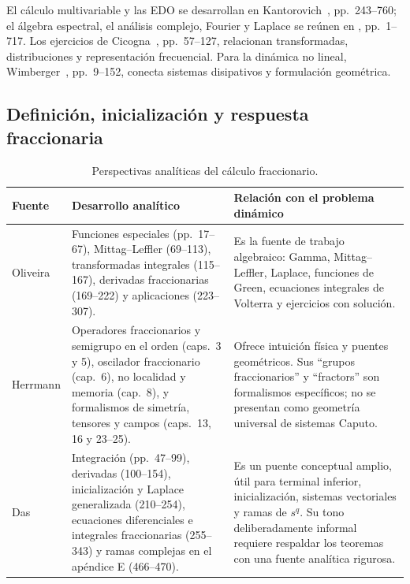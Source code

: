 El cálculo multivariable y las EDO se desarrollan en
Kantorovich~\cite{Kantorovich2022Fundamentals}, pp.\ 243--760; el álgebra
espectral, el análisis complejo, Fourier y Laplace se reúnen en
\cite{Kantorovich2024Advanced}, pp.\ 1--717. Los ejercicios de
Cicogna~\cite{Cicogna2020Exercises}, pp.\ 57--127, relacionan transformadas,
distribuciones y representación frecuencial. Para la dinámica no lineal,
Wimberger~\cite{Wimberger2022Nonlinear}, pp.\ 9--152, conecta sistemas
disipativos y formulación geométrica.

\subsection{Definición, inicialización y respuesta fraccionaria}

\begin{table}[H]
\centering
\caption{Perspectivas analíticas del cálculo fraccionario.}
\label{tab:ruta-frac-books}
\small
\begin{tabularx}{\textwidth}{@{}L{0.24\textwidth}L{0.29\textwidth}Y@{}}
\toprule
Fuente & Desarrollo analítico & Relación con el problema dinámico \\
\midrule
Oliveira \cite{Oliveira2019SolvedFractional} &
Funciones especiales (pp.\ 17--67), Mittag--Leffler (69--113), transformadas
integrales (115--167), derivadas fraccionarias (169--222) y aplicaciones
(223--307). &
Es la fuente de trabajo algebraico: Gamma, Mittag--Leffler, Laplace,
funciones de Green, ecuaciones integrales de Volterra y ejercicios con
solución. \\
Herrmann \cite{Herrmann2014Fractional} &
Operadores fraccionarios y semigrupo en el orden (caps.\ 3 y 5), oscilador
fraccionario (cap.\ 6), no localidad y memoria (cap.\ 8), y formalismos de
simetría, tensores y campos (caps.\ 13, 16 y 23--25). &
Ofrece intuición física y puentes geométricos. Sus ``grupos fraccionarios'' y
``fractors'' son formalismos específicos; no se presentan como geometría
universal de sistemas Caputo. \\
Das \cite{Das2020Kindergarten} &
Integración (pp.\ 47--99), derivadas (100--154), inicialización y Laplace
generalizada (210--254), ecuaciones diferenciales e integrales fraccionarias
(255--343) y ramas complejas en el apéndice E (466--470). &
Es un puente conceptual amplio, útil para terminal inferior, inicialización,
sistemas vectoriales y ramas de \(s^q\). Su tono deliberadamente informal
requiere respaldar los teoremas con una fuente analítica rigurosa. \\
\bottomrule
\end{tabularx}
\end{table}

